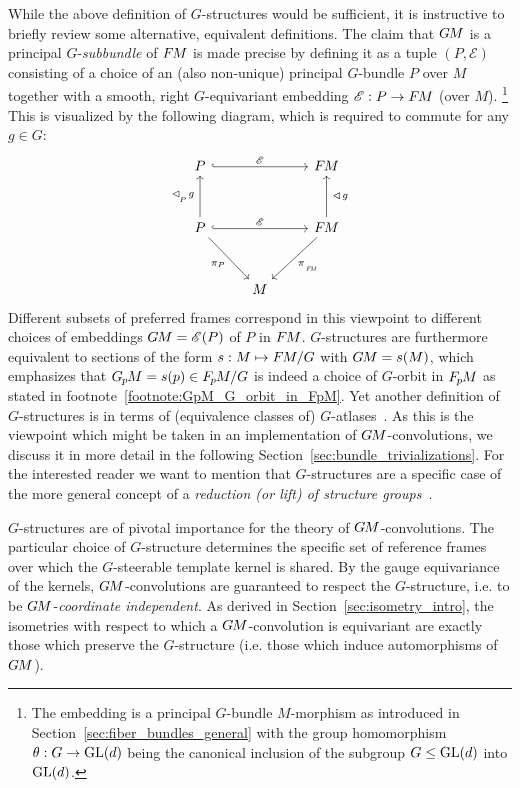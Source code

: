 While the above definition of $G$-structures would be sufficient, it is instructive to briefly review some alternative, equivalent definitions.
The claim that $G\mkern-1.4muM$ is a principal $G$-\emph{subbundle} of $F\mkern-1.5muM$ is made precise by defining it as a tuple $(P, \mathscr{E})$ consisting of a choice of an (also non-unique) principal $G$-bundle $P$ over $M$ together with a smooth, right $G$-equivariant embedding $\mathscr{E}: P \to F\mkern-1.5muM$ (over $M$).%
\footnote{
    The embedding is a principal $G$-bundle $M$-morphism as introduced in Section~\ref{sec:fiber_bundles_general} with the group homomorphism $\theta:G\to\operatorname{GL}(d)$ being the canonical inclusion of the subgroup $G\leq\operatorname{GL}(d)$ into $\operatorname{GL}(d)$.
}
This is visualized by the following diagram, which is required to commute for any $g\in G$:
\begin{equation}\label{cd:GM_def_embedding}
\begin{tikzcd}[row sep=3.em, column sep=2.5em]
    P
        \arrow[rr, "\mathscr{E}", hook]
    && \FM
    \\
    P
        \arrow[rr, "\mathscr{E}", hook]
        \arrow[u, "\lhd_{\overset{}{\mkern-2muP}}\mkern2mu g\:"]
        \arrow[dr, "\pi_P"']
    && \FM
        \arrow[u, "\:\lhd\mkern2mu g"']
        \arrow[dl, "\piFM"]
    \\
    & M
\end{tikzcd}
\end{equation}
Different subsets of preferred frames correspond in this viewpoint to different choices of embeddings ${G\mkern-1.4muM = \mathscr{E}(P)}$ of $P$ in $F\mkern-1.5muM$.
$G$-structures are furthermore equivalent to sections of the form $s: M \mapsto F\mkern-1.5muM/G$ with $G\mkern-1.4muM = s(M)$, which emphasizes that $G_{\mkern-1.3mu p}\mkern-1.2muM = s(p) \in F_{\mkern-1.5mu p}\mkern-1.0muM/G$ is indeed a choice of $G$-orbit in $F_{\mkern-1.5mu p}\mkern-1.0muM$ as stated in footnote~\ref{footnote:GpM_G_orbit_in_FpM}.
Yet another definition of $G$-structures is in terms of (equivalence classes of) $G$-atlases~\cite{wendlLectureNotesBundles2008}.
As this is the viewpoint which might be taken in an implementation of $G\mkern-1.4muM$-convolutions, we discuss it in more detail in the following Section~\ref{sec:bundle_trivializations}.
For the interested reader we want to mention that $G$-structures are a specific case of the more general concept of a \emph{reduction (or lift) of structure groups}~\cite{sternberg1999lectures,piccione2006theory,crainic2013GStructuresExamples}.



$G$-structures are of pivotal importance for the theory of $G\mkern-1.4muM$-convolutions.
The particular choice of $G$-structure determines the specific set of reference frames over which the $G$-steerable template kernel is shared.
By the gauge equivariance of the kernels, $G\mkern-1.4muM$-convolutions are guaranteed to respect the $G$-structure, i.e. to be $G\mkern-1.4muM$-\emph{coordinate independent}.
As derived in Section~\ref{sec:isometry_intro}, the isometries with respect to which a $G\mkern-1.4muM$-convolution is equivariant are exactly those which preserve the $G$-structure (i.e. those which induce automorphisms of~$G\mkern-1.4muM$).









